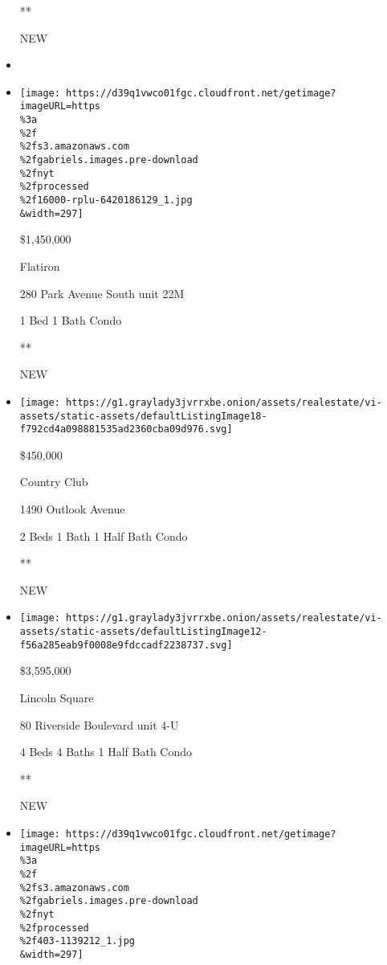 \begin{itemize}
  **

  NEW
\item
\item
  \href{/real-estate/usa/ny/new-york/flatiron/homes-for-sale/280-park-avenue-south/16000-RPLU-6420186129?}{}

  \texttt{[image: https://d39q1vwco01fgc.cloudfront.net/getimage?imageURL=https\\\%3a\\\%2f\\\%2fs3.amazonaws.com\\\%2fgabriels.images.pre-download\\\%2fnyt\\\%2fprocessed\\\%2f16000-rplu-6420186129\_1.jpg\\\&width=297]}

  \$1,450,000

  Flatiron

  280 Park Avenue South unit 22M

  1 Bed \textbar{} 1 Bath \textbar{} Condo

  **

  NEW
\item
  \href{/real-estate/usa/ny/bronx/country-club/homes-for-sale/1490-outlook-avenue/185-20292414?}{}

  \texttt{[image: https://g1.graylady3jvrrxbe.onion/assets/realestate/vi-assets/static-assets/defaultListingImage18-f792cd4a098881535ad2360cba09d976.svg]}

  \$450,000

  Country Club

  1490 Outlook Avenue

  2 Beds \textbar{} 1 Bath \textbar{} 1 Half Bath \textbar{} Condo

  **

  NEW
\item
  \href{/real-estate/usa/ny/new-york/lincoln-square/homes-for-sale/80-riverside-boulevard/12436-OLRS-358644?}{}

  \texttt{[image: https://g1.graylady3jvrrxbe.onion/assets/realestate/vi-assets/static-assets/defaultListingImage12-f56a285eab9f0008e9fdccadf2238737.svg]}

  \$3,595,000

  Lincoln Square

  80 Riverside Boulevard unit 4-U

  4 Beds \textbar{} 4 Baths \textbar{} 1 Half Bath \textbar{} Condo

  **

  NEW
\item
  \href{/real-estate/usa/ny/staten-island/emerson-hill/homes-for-sale/209-gansevoort-boulevard-staten-island-ny-10314/403-1139212?}{}

  \texttt{[image: https://d39q1vwco01fgc.cloudfront.net/getimage?imageURL=https\\\%3a\\\%2f\\\%2fs3.amazonaws.com\\\%2fgabriels.images.pre-download\\\%2fnyt\\\%2fprocessed\\\%2f403-1139212\_1.jpg\\\&width=297]}


\end{itemize}
